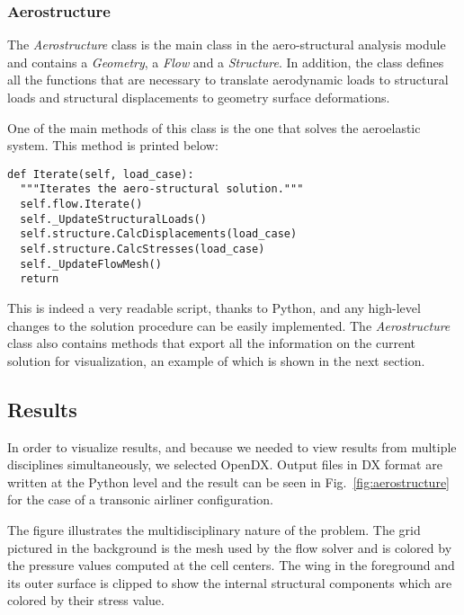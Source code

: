 \documentclass[twocolumn]{article}
\newcommand{\tthhide}[1]{#1}
\newcommand{\latexhide}[1]{}
\begin{document}
\subsubsection{Aerostructure}

The \emph{Aerostructure} class is the main class in the
aero-structural analysis module and contains a \emph{Geometry}, a
\emph{Flow} and a \emph{Structure}.  In addition, the class defines
all the functions that are necessary to translate aerodynamic
loads to structural loads and structural displacements to
geometry surface deformations.

One of the main methods of this class is the one that solves the
aeroelastic system. This method is printed below:
\begin{verbatim}
def Iterate(self, load_case):
  """Iterates the aero-structural solution."""
  self.flow.Iterate()
  self._UpdateStructuralLoads()
  self.structure.CalcDisplacements(load_case)
  self.structure.CalcStresses(load_case)
  self._UpdateFlowMesh()
  return
\end{verbatim}
This is indeed a very readable script, thanks to Python, and any
high-level changes to the solution procedure can be easily
implemented.
The \emph{Aerostructure} class also contains methods that export all
the information on the current solution for visualization, an example
of which is shown in the next section.


\subsection{Results}

In order to visualize results, and because we needed to view results
from multiple disciplines simultaneously, we selected OpenDX. Output
files in DX format are written at the Python level and the result can
be seen in Fig.~\ref{fig:aerostructure} for the case of a transonic
airliner configuration.
\tthhide{
\begin{figure*}[t]
  \centering
  \epsfig{file=./aerostructure.eps, angle=-90, width=\linewidth}
  \caption{Aero-structural model and results.}
  \label{fig:aerostructure}
\end{figure*}
}
\latexhide{
\begin{figure}[h]
  \label{fig:aerostructure}
\special{html:
<CENTER>
 <IMG SRC="aerostructure.jpg" WIDTH="600">
</CENTER>
}
  \caption{Aero-structural model and results.}
\end{figure}
}


The figure illustrates the multidisciplinary nature of the
problem. The grid pictured in the background is the mesh used by the
flow solver and is colored by the pressure values computed at the
cell centers. The wing in the foreground and its outer surface is
clipped to show the internal structural components which are colored
by their stress value.
\end{document}
